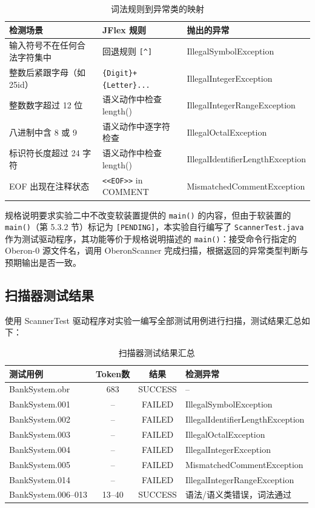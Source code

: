 \begin{table}[htbp]
    \centering
    \begin{tabular}{|l|l|l|}
    \hline
    \textbf{检测场景} & \textbf{JFlex 规则} & \textbf{抛出的异常} \\
    \hline
    输入符号不在任何合法字符集中 & 回退规则 \verb|[^]| & IllegalSymbolException \\
    整数后紧跟字母（如 25id） & \texttt{\{Digit\}+\{Letter\}...} & IllegalIntegerException \\
    整数数字超过 12 位 & 语义动作中检查 length() & IllegalIntegerRangeException \\
    八进制中含 8 或 9 & 语义动作中逐字符检查 & IllegalOctalException \\
    标识符长度超过 24 字符 & 语义动作中检查 length() & IllegalIdentifierLengthException \\
    EOF 出现在注释状态 & \texttt{<<EOF>>} in COMMENT & MismatchedCommentException \\
    \hline
    \end{tabular}
    \caption{词法规则到异常类的映射}
    \label{tab:lexical-exception-mapping}
\end{table}

规格说明要求实验二中不改变软装置提供的 \texttt{main()} 的内容，但由于软装置的 \texttt{main()}（第 5.3.2 节）标记为 \texttt{[PENDING]}，本实验自行编写了 \texttt{ScannerTest.java} 作为测试驱动程序，其功能等价于规格说明描述的 \texttt{main()}：接受命令行指定的 Oberon-0 源文件名，调用 OberonScanner 完成扫描，根据返回的异常类型判断与预期输出是否一致。

\subsection{扫描器测试结果}

使用 ScannerTest 驱动程序对实验一编写全部测试用例进行扫描，测试结果汇总如下：

\begin{table}[htbp]
    \centering
    \begin{tabular}{|l|c|c|l|}
    \hline
    \textbf{测试用例} & \textbf{Token数} & \textbf{结果} & \textbf{检测异常} \\
    \hline
    BankSystem.obr & 683 & SUCCESS & -- \\
    BankSystem.001 & -- & FAILED & IllegalSymbolException \\
    BankSystem.002 & -- & FAILED & IllegalIdentifierLengthException \\
    BankSystem.003 & -- & FAILED & IllegalOctalException \\
    BankSystem.004 & -- & FAILED & IllegalIntegerException \\
    BankSystem.005 & -- & FAILED & MismatchedCommentException \\
    BankSystem.014 & -- & FAILED & IllegalIntegerRangeException \\
    BankSystem.006--013 & 13--40 & SUCCESS & 语法/语义类错误，词法通过 \\
    \hline
    \end{tabular}
    \caption{扫描器测试结果汇总}
    \label{tab:scanner-results}
\end{table}

